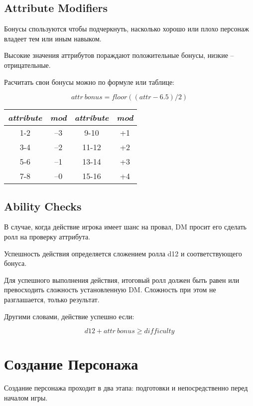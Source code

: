 \documentclass[a4paper,12pt,twocolumn]{book}
\begin{document}
\section{Attribute Modifiers}

Бонусы спользуются чтобы подчеркнуть, насколько хорошо или плохо персонаж владеет тем или иным навыком.

Высокие значения аттрибутов пораждают положительные бонусы, низкие -- отрицательные.

Расчитать свои бонусы можно по формуле или таблице:

\[attr\ bonus = floor((attr - 6.5)/2)\]

\begin{center}
\begin{tabular}{ c c | c c }
  \emph{attribute} & \emph{mod} & \emph{attribute} & \emph{mod} \\
  \hline
  1-2 & --3 & 9-10 & +1 \\
  3-4 & --2 & 11-12 & +2 \\
  5-6 & --1 & 13-14 & +3 \\
  7-8 & --0 & 15-16 & +4

\end{tabular}
\end{center}

\section{Ability Checks}

В случае, когда действие игрока имеет шанс на провал, DM просит его сделать ролл на проверку аттрибута.

Успешность действия определяется сложением ролла d12 и соответствующего бонуса.

Для успешного выполнения действия, итоговый ролл должен быть равен или превосходить сложность установленную DM. Сложность при этом не разглашается, только результат.

Другими словами, действие успешно если:

\[d12 + attr\ bonus \geq difficulty \]


\chapter{Создание Персонажа}

\lettrine{С}{}оздание персонажа проходит в два этапа: подготовки и непосредственно перед началом игры.
\end{document}
